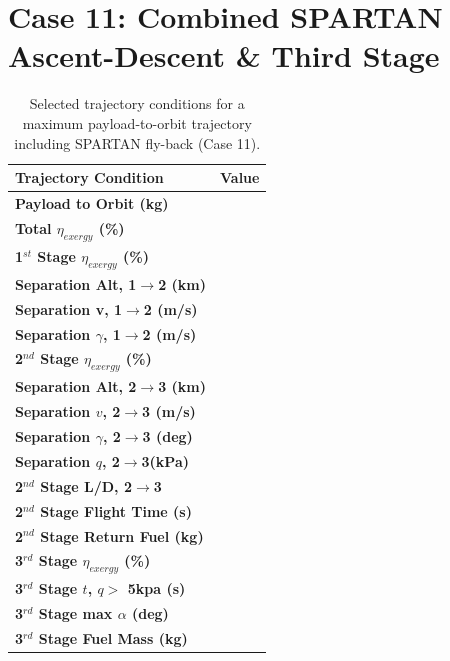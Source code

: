 \section{Case 11: Combined SPARTAN Ascent-Descent \& Third Stage}
\begin{table}[ht]
	\centering
\begin{tabular}{l c } 
	\hline \textbf{Trajectory Condition}
	& Value

	\\
	\hline \textbf{Payload to Orbit (kg)}
	& \textbf{\PayloadToOrbitStandard}
	\\
	\textbf{Total $\eta_{exergy}$ (\%)}
	& \textbf{\totalExergyEffStandard}
	\\
	\hline 
	\textbf{1$^{st}$ Stage $\eta_{exergy}$ (\%)}
	& \textbf{\firstExergyEffStandard}
	\\
	\textbf{Separation Alt, 1$\rightarrow$2 (km)}
	& \firstsecondSeparationAltStandard
	\\
	\textbf{Separation v, 1$\rightarrow$2 (m/s)}
	& \firstsecondSeparationvStandard
	\\
	\textbf{Separation $\gamma$, 1$\rightarrow$2 (m/s)}
	& \firstsecondSeparationgammaStandard
	\\
	\hline 
	\textbf{2$^{nd}$ Stage $\eta_{exergy}$ (\%)}
	& \textbf{\secondExergyEffStandard}
	\\
	\textbf{Separation Alt, 2$\rightarrow$3 (km)}
	& \secondthirdSeparationAltStandard
	\\
	\textbf{Separation $v$, 2$\rightarrow$3 (m/s)}
	& \secondthirdSeparationvStandard
	\\
	\textbf{Separation $\gamma$, 2$\rightarrow$3 (deg)}
	& \secondthirdSeparationgammaStandard
	\\
	\textbf{Separation $q$, 2$\rightarrow$3(kPa)}
	& \secondthirdSeparationqStandard
	\\
	\textbf{2$^{nd}$ Stage L/D, 2$\rightarrow$3}
	& \secondthirdSeparationLDStandard
	\\
	\textbf{2$^{nd}$ Stage Flight Time (s)}
	& \secondFlightTimeStandard
	\\
		\textbf{2$^{nd}$ Stage Return Fuel (kg)}
		& \returnFuelStandard
		\\
	\hline 
	\textbf{3$^{rd}$ Stage $\eta_{exergy}$ (\%)}
	& \textbf{\thirddExergyEffStandard}
	\\

	\textbf{3$^{rd}$ Stage $t$, $q >$ 5kpa (s)}
	& \thirdqOverFiveStandard
	\\
	\textbf{3$^{rd}$ Stage max $\alpha$ (deg)}
	& \thirdmaxAoAStandard
	\\
	\textbf{3$^{rd}$ Stage Fuel Mass (kg)}
	& \thirdmFuelStandard
	\\
	\hline 
\end{tabular} 
\caption{Selected trajectory conditions for a maximum payload-to-orbit trajectory including SPARTAN fly-back (Case 11).}
\end{table}

